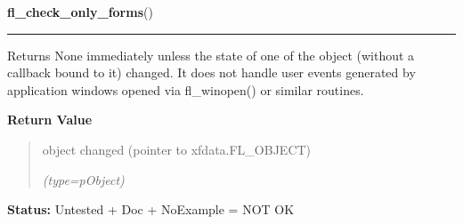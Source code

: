     \label{xformslib:library:fl_check_only_forms}

    \vspace{0.5ex}

\hspace{.8\funcindent}\begin{boxedminipage}{\funcwidth}

    \raggedright \textbf{fl\_check\_only\_forms}()

    \vspace{-1.5ex}

    \rule{\textwidth}{0.5\fboxrule}
\setlength{\parskip}{2ex}
    Returns None immediately unless the state of one of the object (without
    a callback bound to it) changed. It does not handle user events 
    generated by application windows opened via fl\_winopen() or similar 
    routines.

\setlength{\parskip}{1ex}
      \textbf{Return Value}
    \vspace{-1ex}

      \begin{quote}
      object changed (pointer to xfdata.FL\_OBJECT)

      {\it (type=pObject)}

      \end{quote}

\textbf{Status:} Untested + Doc + NoExample = NOT OK



    \end{boxedminipage}

    \label{xformslib:library:fl_freeze_form}

    \vspace{0.5ex}

